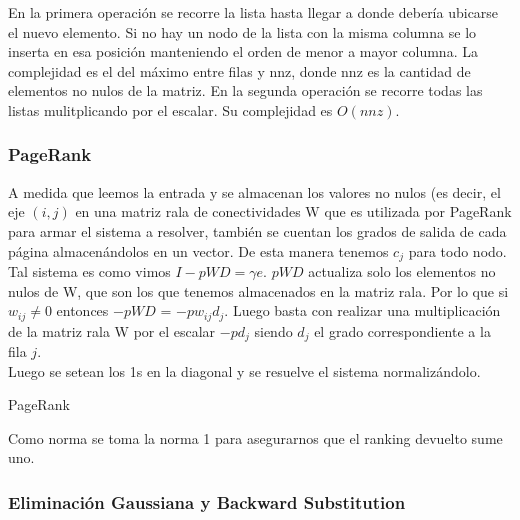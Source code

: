 En la primera operación se recorre la lista hasta llegar a donde debería ubicarse el nuevo elemento. Si no hay un nodo de la lista con la misma columna se lo inserta en esa posición manteniendo el orden de menor a mayor columna. La complejidad es el del máximo entre filas y nnz, donde nnz es la cantidad de elementos no nulos de la matriz.
En la segunda operación se recorre todas las listas mulitplicando por el escalar. Su complejidad es $O(nnz)$.


\subsubsection{PageRank}

A medida que leemos la entrada y se almacenan los valores no nulos (es decir, el eje $(i,j)$ en una matriz rala de conectividades W que es utilizada por PageRank para armar el sistema a resolver, también se cuentan los grados de salida de cada página almacenándolos en un vector. De esta manera tenemos $c_{j}$ para todo nodo. \\

Tal sistema es como vimos $ I - pWD = \gamma e $. $pWD$ actualiza solo los elementos no nulos de W, que son los que tenemos almacenados en la matriz rala. Por lo que si $w_{ij} \neq 0$ entonces $-pWD$ = $-pw_{ij}d_{j}$.  Luego basta con realizar una multiplicación de la matriz rala W por el escalar $-pd_{j}$ siendo $d_{j}$ el grado correspondiente a la fila $j$. \\

Luego se setean los 1s en la diagonal y se resuelve el sistema normalizándolo.  \\

\begin{algorithm}[H]
\caption{PageRank}
\begin{algorithmic}[3]
    \EndFor	
\EndProcedure 

\end{algorithmic}
\end{algorithm} 

Como norma se toma la norma 1 para asegurarnos que el ranking devuelto sume uno. \\


\subsubsection{Eliminación Gaussiana y Backward Substitution}

